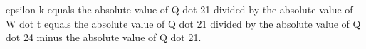 epsilon k equals the absolute value of Q dot 21 divided by the absolute value of W dot t equals the absolute value of Q dot 21 divided by the absolute value of Q dot 24 minus the absolute value of Q dot 21.